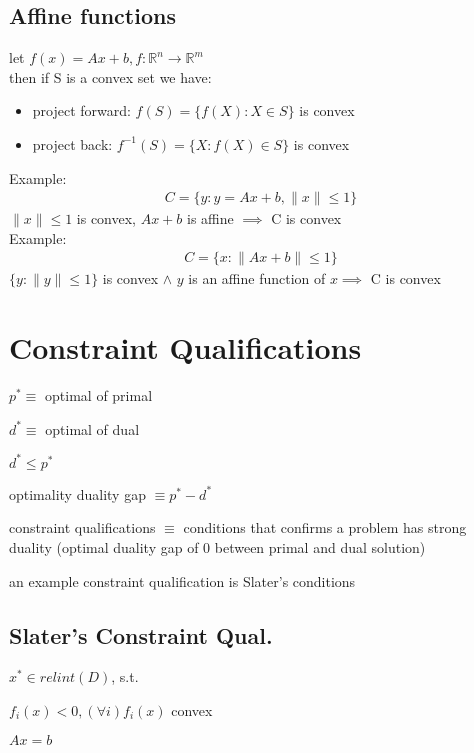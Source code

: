 \documentclass[8pt]{extarticle}
\newcommand{\R}{\mathbb{R}}
\newcommand{\norm}[1]{\|#1\|}
\begin{document}
\begin{multicols*}{2}
  \subsection{Affine functions}
  let $f(x)=Ax+b, f:\R^n \to \R^m$\\
  then if S is a convex set we have:
  \begin{itemize}
  \item project forward: $f(S) = \{ f(X) : X \in S \}$ is convex
  \item project back: $f^{-1}(S) = \{ X : f(X) \in S \}$ is convex
  \end{itemize}
  Example:
  \begin{align*}
    C = \{ y : y=Ax+b, \norm{x} \leq 1\}
  \end{align*}
  $\norm{x} \leq 1$ is convex, $Ax+b$ is affine $\implies$ C is convex\\
  Example:
  \begin{align*}
    C = \{ x : \norm{Ax+b} \leq 1 \}
  \end{align*}
    $\{y: \norm{y} \leq 1 \}$ is convex $\wedge$ $y$ is an affine function of $x \implies$ C is convex\\

  \vfill\null
  \pagebreak

  \section{Constraint Qualifications}

  $p^* \equiv$ optimal of primal
  
  $d^* \equiv$  optimal of dual

  $d^* \leq p^*$
  
  optimality duality gap $\equiv p^* - d^*$
  
  constraint qualifications $\equiv$ conditions that confirms a problem has strong duality (optimal duality gap of 0 between primal and dual solution)

  an example constraint qualification is Slater's conditions

  \subsection{Slater's Constraint Qual.}
  
  $x^* \in relint(D)$, s.t.
  
  $f_i(x)<0, (\forall i) f_i(x)$ convex
  
  $Ax=b$


\end{multicols*}
\end{document}
